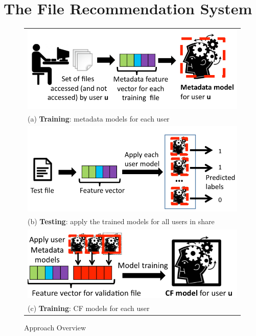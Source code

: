\section{The File Recommendation System}
\label{sec:overallsystem}
\begin{figure}
\centering
{\fontsize{8pt}{1em}\selectfont
\begin{tabular}{c}
\includegraphics[trim = 0mm 0mm 0mm 4mm, clip, width=0.65\linewidth]{FileAccess/figs/meta_training} \\
\multicolumn{1}{l}{(a) \textbf{Training}: metadata models for each user} \\ 
\includegraphics[trim = 0mm 0mm 0mm 7mm, clip, width=0.65\linewidth]{FileAccess/figs/testing} \\
\multicolumn{1}{l}{(b) \textbf{Testing}: apply the trained models for all users in share} \\  
\includegraphics[width=0.62\linewidth]{FileAccess/figs/cf_training2} \\
\multicolumn{1}{l}{(c) \textbf{Training}: CF models for each user} \\  
\end{tabular}
}
\caption{Approach Overview}
\label{fig:overallfigs}
\end{figure}

